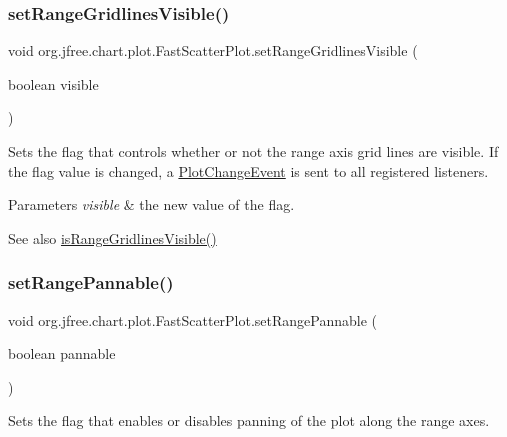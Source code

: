\subsubsection{\texorpdfstring{set\+Range\+Gridlines\+Visible()}{setRangeGridlinesVisible()}}
{\footnotesize\ttfamily void org.\+jfree.\+chart.\+plot.\+Fast\+Scatter\+Plot.\+set\+Range\+Gridlines\+Visible (\begin{DoxyParamCaption}\item[{boolean}]{visible }\end{DoxyParamCaption})}

Sets the flag that controls whether or not the range axis grid lines are visible. If the flag value is changed, a \mbox{\hyperlink{}{Plot\+Change\+Event}} is sent to all registered listeners.


\begin{DoxyParams}{Parameters}
{\em visible} & the new value of the flag.\\
\hline
\end{DoxyParams}
\begin{DoxySeeAlso}{See also}
\mbox{\hyperlink{classorg_1_1jfree_1_1chart_1_1plot_1_1_fast_scatter_plot_a1d16d8a7ba258ba24a2eb4806b89884f}{is\+Range\+Gridlines\+Visible()}} 
\end{DoxySeeAlso}
\mbox{\label{classorg_1_1jfree_1_1chart_1_1plot_1_1_fast_scatter_plot_a102e895df237168d931eea1cb47e3f4b}} 
\subsubsection{\texorpdfstring{set\+Range\+Pannable()}{setRangePannable()}}
{\footnotesize\ttfamily void org.\+jfree.\+chart.\+plot.\+Fast\+Scatter\+Plot.\+set\+Range\+Pannable (\begin{DoxyParamCaption}\item[{boolean}]{pannable }\end{DoxyParamCaption})}

Sets the flag that enables or disables panning of the plot along the range axes.


